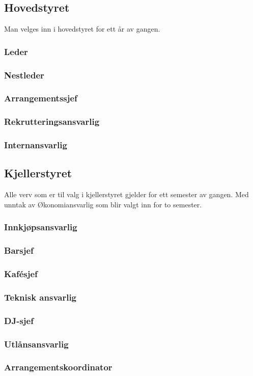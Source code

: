 \documentclass[10pt,norsk,a4paper]{article}
\begin{document}
\begin{minipage}[t]{0.49\textwidth}
\subsection{Hovedstyret}
Man velges inn i hovedstyret for ett år av gangen.

\subsubsection{Leder}
\subsubsection{Nestleder}
\subsubsection{Arrangementssjef}
\subsubsection{Rekrutteringsansvarlig}
\subsubsection{Internansvarlig}

\end{minipage}
\begin{minipage}[t]{0.49\textwidth}
\subsection{Kjellerstyret} %
Alle verv som er til valg i kjellerstyret gjelder for ett semester av gangen. Med unntak av Økonomiansvarlig som blir valgt inn for to semester.

\subsubsection{Innkjøpsansvarlig}
\subsubsection{Barsjef}
\subsubsection{Kafésjef}
\subsubsection{Teknisk ansvarlig}
\subsubsection{DJ-sjef}
\subsubsection{Utlånsansvarlig}
\subsubsection{Arrangementskoordinator}

\end{minipage}
\end{document}
